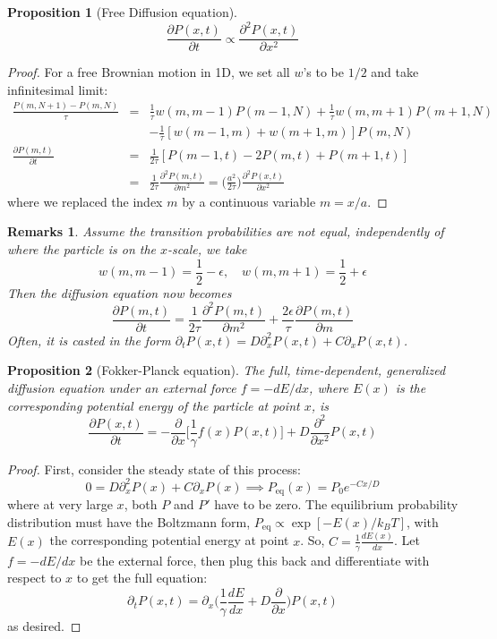 \documentclass[a4paper]{article}
\newtheorem{remarks}{Remarks}[section]
\theoremstyle{new}
\newtheorem{prop}{Proposition}[section]
\begin{document}
\begin{prop}[Free Diffusion equation]
$$\frac{\partial P(x,t)}{\partial t}\propto\frac{\partial^2P(x,t)}{\partial x^2}$$
\end{prop}
\begin{proof}
For a free Brownian motion in 1D, we set all $w$'s to be $1/2$ and take infinitesimal limit:
\begin{eqnarray}
\frac{P(m,N+1)-P(m,N)}{\tau}&=&\frac{1}{\tau}w(m,m-1)P(m-1,N)+\frac{1}{\tau}w(m,m+1)P(m+1,N)\nonumber\\&&-\frac{1}{\tau}[w(m-1,m)+w(m+1,m)]P(m,N)\nonumber\\\frac{\partial P(m,t)}{\partial t}&=&\frac{1}{2\tau}[P(m-1,t)-2P(m,t)+P(m+1,t)]\nonumber\\&=&\frac{1}{2\tau}\frac{\partial^2P(m,t)}{\partial m^2}=\bigg(\frac{a^2}{2\tau}\bigg)\frac{\partial^2P(x,t)}{\partial x^2}\nonumber
\end{eqnarray}
where we replaced the index $m$ by a continuous variable $m=x/a$.
\end{proof}
\begin{remarks}
Assume the transition probabilities are not equal, independently of where the particle is on the $x$-scale, we take
$$w(m,m-1)=\frac{1}{2}-\epsilon,\quad w(m,m+1)=\frac{1}{2}+\epsilon$$
Then the diffusion equation now becomes
$$\frac{\partial P(m,t)}{\partial t}=\frac{1}{2\tau}\frac{\partial^2P(m,t)}{\partial m^2}+\frac{2\epsilon}{\tau}\frac{\partial P(m,t)}{\partial m}$$
Often, it is casted in the form $\partial_tP(x,t)=D\partial_x^2P(x,t)+C\partial_xP(x,t)$. 
\end{remarks}
\begin{prop}[Fokker-Planck equation]
The full, time-dependent, generalized diffusion equation under an external force $f=-dE/dx$, where $E(x)$ is the corresponding potential energy of the particle at point $x$, is
$$\frac{\partial P(x,t)}{\partial t}=-\frac{\partial}{\partial x}\bigg[\frac{1}{\gamma}f(x)P(x,t)\bigg]+D\frac{\partial^2}{\partial x^2}P(x,t)$$
\end{prop}
\begin{proof}
First, consider the steady state of this process:
$$0=D\partial_x^2P(x)+C\partial_xP(x)\implies P_{\text{eq}}(x)=P_0e^{-Cx/D}$$
where at very large $x$, both $P$ and $P'$ have to be zero. The equilibrium probability distribution must have the Boltzmann form, $P_{\text{eq}}\propto\exp[-E(x)/k_BT]$, with $E(x)$ the corresponding potential energy at point $x$. So, $C=\frac{1}{\gamma}\frac{dE(x)}{dx}$. Let $f=-dE/dx$ be the external force, then plug this back and differentiate with respect to $x$ to get the full equation:
$$\partial_tP(x,t)=\partial_x\bigg(\frac{1}{\gamma}\frac{dE}{dx}+D\frac{\partial}{\partial x}\bigg)P(x,t)$$
as desired.
\end{proof}
\end{document}
